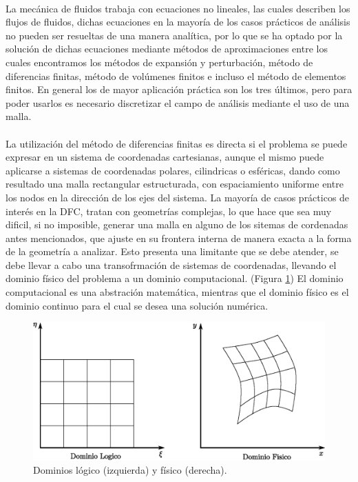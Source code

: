\documentclass[letterpaper, openright, 12pt]{book}
\begin{document}
    \paragraph*{}
    La mecánica de fluidos trabaja con ecuaciones no lineales, las cuales
    describen los flujos de fluidos, dichas ecuaciones en la mayoría de los
    casos prácticos de análisis no pueden ser resueltas de una manera analítica,
    por lo que se ha optado por la solución de dichas ecuaciones mediante
    métodos de aproximaciones entre los cuales encontramos los métodos de
    expansión y perturbación, método de diferencias finitas, método de volúmenes
    finitos e incluso el método de elementos finitos. En general los de mayor
    aplicación práctica son los tres últimos, pero para poder usarlos es
    necesario discretizar el campo de análisis mediante el uso de una malla.\cite{thompsonhandbook}
    \paragraph*{}
    La utilización del método de diferencias finitas es directa si el problema
    se puede expresar en un sistema de coordenadas cartesianas, aunque el mismo
    puede aplicarse a sistemas de coordenadas polares, cilindricas o esféricas,
    dando como resultado una malla rectangular estructurada, con espaciamiento
    uniforme entre los nodos en la dirección de los ejes del sistema. La mayoría
    de casos prácticos de interés en la DFC, tratan con geometrías complejas,
    lo que hace que sea muy dificil, si no imposible, generar una malla en
    alguno de los sitemas de cordenadas antes mencionados, que ajuste en su
    frontera interna de manera exacta a la forma de la geometría a analizar.
    Esto presenta una limitante que se debe atender, se debe llevar a cabo una
    transofrmación de sistemas de coordenadas, llevando el dominio físico del
    problema a un dominio computacional. (Figura \ref{fig:dominios}) El dominio
    computacional es una abstración matemática, mientras que el dominio físico
    es el dominio continuo para el cual se desea una solución numérica.
    \begin{figure}[htbp!]
        \centering
        \includegraphics[width=170mm]{./Imagenes/dominios}
        \caption[Dominios lógico y físico]{Dominios lógico (izquierda) y físico (derecha). \cite{numerical-grid}}
        \label{fig:dominios}
    \end{figure}
\end{document}
